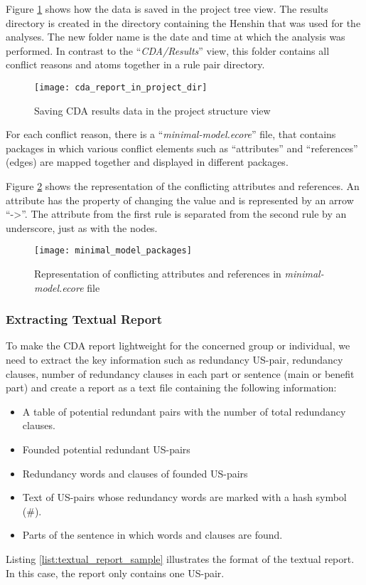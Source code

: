  Figure \ref{fig:cda_report_in_project_dir} shows how the data is saved in the project tree view. The results directory is created in the directory containing the Henshin that was used for the analyses. The new folder name is the date and time at which the analysis was performed. In contrast to the \enquote{\textit{CDA/Results}} view, this folder contains all conflict reasons and atoms together in a rule pair directory.
  \begin{figure}[h]
 	\centering
 	\texttt{[image: cda\_report\_in\_project\_dir]}
 	\caption{Saving CDA results data in the project structure view}\label{fig:cda_report_in_project_dir}
 \end{figure}
 
 For each conflict reason, there is a \enquote{\textit{minimal-model.ecore}} file, that contains packages in which various conflict elements such as \enquote{attributes} and \enquote{references} (edges) are mapped together and displayed in different packages.
 
 Figure \ref{fig:minimal_model_packages} shows the representation of the conflicting attributes and references. An attribute has the property of changing the value and is represented by an arrow \enquote{-\textgreater}. The attribute from the first rule is separated from the second rule by an underscore, just as with the nodes.
  \begin{figure}[h]
 	\centering
 	\texttt{[image: minimal\_model\_packages]}
 	\caption{Representation of conflicting attributes and references in \textit{minimal-model.ecore} file}\label{fig:minimal_model_packages}
 \end{figure}
\subsubsection*{Extracting Textual Report}
To make the CDA report lightweight for the concerned group or individual, we need to extract the key information such as redundancy US-pair, redundancy clauses, number of redundancy clauses in each part or sentence (main or benefit part) and create a report as a text file containing the following information:
\begin{itemize}
	\item A table of potential redundant pairs with the number of total redundancy clauses.
	\item Founded potential redundant US-pairs
	\item Redundancy words and clauses of founded US-pairs
	\item Text of US-pairs whose redundancy words are marked with a hash symbol (\#).
	\item Parts of the sentence in which words and clauses are found.
\end{itemize}
Listing \ref{list:textual_report_sample} illustrates the format of the textual report. In this case, the report only contains one US-pair.

